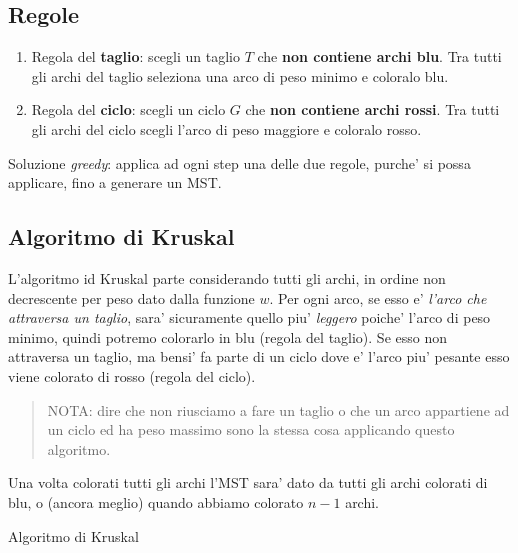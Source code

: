 \documentclass{article}
\begin{document}
\subsection{Regole}

\begin{enumerate}
  \item Regola del \textbf{taglio}: scegli un taglio $T$ che \textbf{non contiene
    archi blu}. Tra tutti gli archi del taglio seleziona una arco di peso minimo e
    coloralo blu.
  \item Regola del \textbf{ciclo}: scegli un ciclo $G$ che \textbf{non contiene
    archi rossi}. Tra tutti gli archi del ciclo scegli l'arco di peso maggiore e
    coloralo rosso.
\end{enumerate}

Soluzione \emph{greedy}: applica ad ogni step una delle due regole, purche' si
possa applicare, fino a generare un MST.

\subsection{Algoritmo di Kruskal}

L'algoritmo id Kruskal parte considerando tutti gli archi, in ordine non
decrescente per peso dato dalla funzione $w$. Per ogni arco, se esso e'
\emph{l'arco che attraversa un taglio}, sara' sicuramente quello piu'
\emph{leggero} poiche' l'arco di peso minimo, quindi potremo colorarlo in blu
(regola del taglio). Se esso non attraversa un taglio, ma bensi' fa parte di un
ciclo dove e' l'arco piu' pesante esso viene colorato di rosso (regola del ciclo).

\begin{quote}
  NOTA: dire che non riusciamo a fare un taglio o che un arco appartiene ad un ciclo
  ed ha peso massimo sono la stessa cosa applicando questo algoritmo.
\end{quote}

Una volta colorati tutti gli archi l'MST sara' dato da tutti gli archi colorati
di blu, o (ancora meglio) quando abbiamo colorato $n-1$ archi.

\begin{algorithm}[H]
  \caption{Algoritmo di Kruskal}
\end{algorithm}
\end{document}
